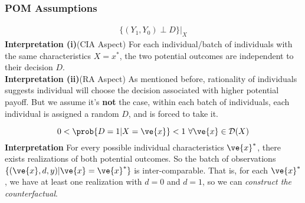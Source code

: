 \documentclass[11pt]{article}
\begin{document}
				\subsubsection{POM Assumptions}
					\begin{assumption}
						\begin{gather}
							\{(Y_1, Y_0) \perp D\}|_{X}
						\end{gather}
						\textbf{Interpretation (i)}(CIA Aspect) For each individual/batch of individuals with the same characteristics $X = x^*$, the two potential outcomes are independent to their decision $D$. \\
						\textbf{Interpretation (ii)}(RA Aspect) As mentioned before, rationality of individuals suggests individual will choose the decision associated with higher potential payoff. But we assume it's \textbf{not} the case, within each batch of individuals, each individual is assigned a random $D$, and is forced to take it.
					\end{assumption}
					
					\begin{assumption}
						\begin{equation}
							0 < \prob{D=1|X=\ve{x}} < 1\ \forall \ve{x} \in \mc{D}(X)
						\end{equation}
						\textbf{Interpretation} For every possible individual characteristics $\ve{x}^*$, there exists realizations of both potential outcomes. So the batch of observations $\{(\ve{x}, d, y)|\ve{x} = \ve{x}^*\}$ is inter-comparable. That is, for each $\ve{x}^*$, we have at least one realization with $d=0$ and $d=1$, so we can \emph{construct the counterfactual}.
					\end{assumption}
\end{document}
